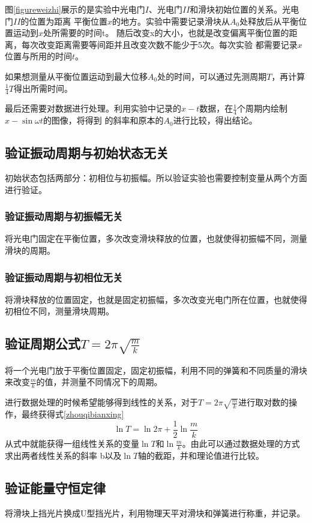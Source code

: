\documentclass{ctexart}
\begin{document}
  图\ref{figureweizhi}展示的是实验中光电门$I$、光电门$II$和滑块初始位置的关系。光电门$II$的位置为距离
  平衡位置$x$的地方。实验中需要记录滑块从$A_{0}$处释放后从平衡位置运动到$x$处所需要的时间t。
  随后改变x的大小，也就是改变偏离平衡位置的距离，每次改变距离需要等间距并且改变次数不能少于5次。每次实验
  都需要记录$x$位置与所用的时间$t$。

  如果想测量从平衡位置运动到最大位移$A_{0}$处的时间，可以通过先测周期$T$，再计算$\frac{1}{4}T$得出所需时间。
  
  最后还需要对数据进行处理。利用实验中记录的$x-t$数据，在$\frac{1}{4}$个周期内绘制$x-\sin{\omega t}$的图像，将得到
  的斜率和原本的$A_{0}$进行比较，得出结论。

  \subsection{验证振动周期与初始状态无关}
  初始状态包括两部分：初相位与初振幅。所以验证实验也需要控制变量从两个方面进行验证。
    \subsubsection{验证振动周期与初振幅无关}
    将光电门固定在平衡位置，多次改变滑块释放的位置，也就使得初振幅不同，测量滑块的周期。
    \subsubsection{验证振动周期与初相位无关}
    将滑块释放的位置固定，也就是固定初振幅，多次改变光电门所在位置，也就使得初相位不同，测量滑块周期。

  \subsection{验证周期公式$T=2\pi \sqrt{\frac{m}{k}}$}
  将一个光电门放于平衡位置固定，固定初振幅，利用不同的弹簧和不同质量的滑块来改变$\frac{m}{k}$的值，并测量不同情况下的周期。

  进行数据处理的时候希望能够得到线性的关系，对于$T=2\pi \sqrt{\frac{m}{k}}$进行取对数的操作，最终获得式\ref{zhouqibianxing}
  \begin{equation}\label{zhouqibianxing}
    \ln T = \ln 2\pi +\frac{1}{2} \ln \frac{m}{k}
  \end{equation}
  从式中就能获得一组线性关系的变量$\ln T \mbox{和} \ln \frac{m}{k}$。由此可以通过数据处理的方式求出两者线性关系的斜率
  b以及$\ln T$轴的截距，并和理论值进行比较。

  \subsection{验证能量守恒定律}
  将滑块上挡光片换成U型挡光片，利用物理天平对滑块和弹簧进行称重，并记录。
\end{document}
